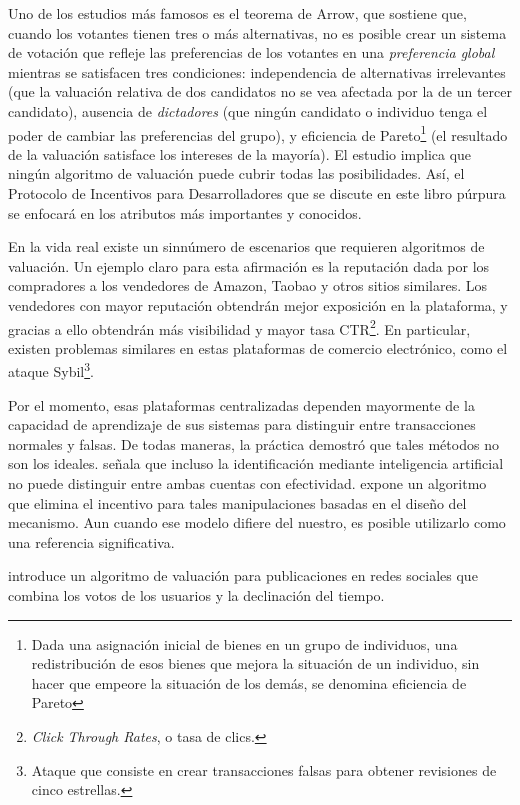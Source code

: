 Uno de los estudios más famosos es el teorema de Arrow, que sostiene que, cuando los votantes tienen tres o más alternativas, no es posible crear un sistema de votación que refleje las preferencias de los votantes en una \textit{preferencia global} mientras se satisfacen tres condiciones: independencia de alternativas irrelevantes (que la valuación relativa de dos candidatos no se vea afectada por la de un tercer candidato), ausencia de \textit{dictadores} (que ningún candidato o individuo tenga el poder de cambiar las preferencias del grupo), y eficiencia de Pareto\footnote{Dada una asignación inicial de bienes en un grupo de individuos, una redistribución de esos bienes que mejora la situación de un individuo, sin hacer que empeore la situación de los demás, se denomina eficiencia de Pareto} (el resultado de la valuación satisface los intereses de la mayoría). El estudio implica que ningún algoritmo de valuación puede cubrir todas las posibilidades. Así, el Protocolo de Incentivos para Desarrolladores que se discute en este libro púrpura se enfocará en los atributos más importantes y conocidos.

En la vida real existe un sinnúmero de escenarios que requieren algoritmos de valuación. Un ejemplo claro para esta afirmación es la reputación dada por los compradores a los vendedores de Amazon, Taobao y otros sitios similares. Los vendedores con mayor reputación obtendrán mejor exposición en la plataforma, y gracias a ello obtendrán más visibilidad y mayor tasa CTR\footnote{\textit{Click Through Rates}, o tasa de clics.}. En
particular, existen problemas similares en estas plataformas de comercio electrónico, como el ataque Sybil\footnote{Ataque que consiste en crear transacciones falsas para obtener revisiones de cinco estrellas.}.

Por el momento, esas plataformas centralizadas dependen mayormente de la capacidad de aprendizaje de sus sistemas para distinguir entre transacciones normales y falsas\cite{mukherjee2013spotting,jindal2008opinion,yoo2009comparison}.
De todas maneras, la práctica demostró que tales métodos no son los ideales.
\cite{ott2011finding} señala que incluso la identificación mediante inteligencia artificial no puede distinguir entre ambas cuentas con efectividad. \cite{cai2016mechanism} expone un algoritmo que elimina el incentivo para tales manipulaciones basadas en el diseño del mecanismo. Aun cuando ese modelo difiere del nuestro, es posible utilizarlo como una referencia significativa.

\cite{salihefendic2010hacker} introduce un algoritmo de valuación para publicaciones en redes sociales que combina los votos de los usuarios y la declinación del tiempo.


